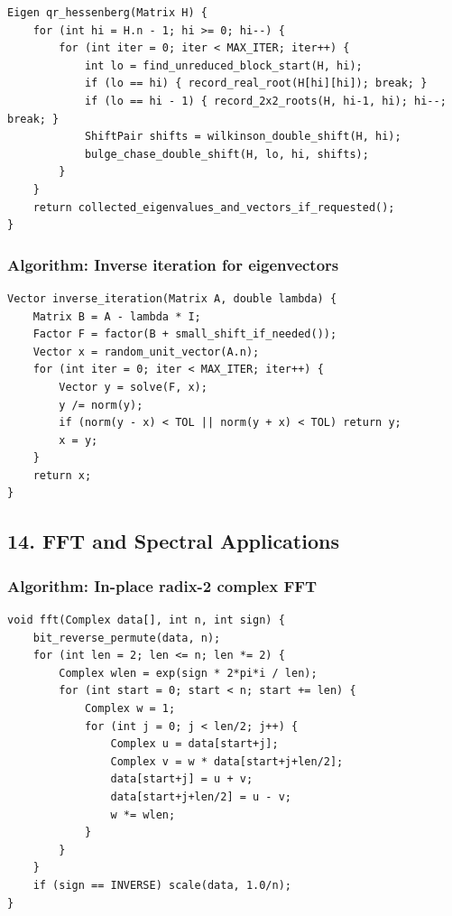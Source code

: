 \documentclass[11pt]{article}
\begin{document}
\begin{verbatim}
Eigen qr_hessenberg(Matrix H) {
    for (int hi = H.n - 1; hi >= 0; hi--) {
        for (int iter = 0; iter < MAX_ITER; iter++) {
            int lo = find_unreduced_block_start(H, hi);
            if (lo == hi) { record_real_root(H[hi][hi]); break; }
            if (lo == hi - 1) { record_2x2_roots(H, hi-1, hi); hi--; break; }
            ShiftPair shifts = wilkinson_double_shift(H, hi);
            bulge_chase_double_shift(H, lo, hi, shifts);
        }
    }
    return collected_eigenvalues_and_vectors_if_requested();
}
\end{verbatim}

\subsubsection{Algorithm: Inverse iteration for eigenvectors}\label{algorithm-inverse-iteration-for-eigenvectors}

\begin{verbatim}
Vector inverse_iteration(Matrix A, double lambda) {
    Matrix B = A - lambda * I;
    Factor F = factor(B + small_shift_if_needed());
    Vector x = random_unit_vector(A.n);
    for (int iter = 0; iter < MAX_ITER; iter++) {
        Vector y = solve(F, x);
        y /= norm(y);
        if (norm(y - x) < TOL || norm(y + x) < TOL) return y;
        x = y;
    }
    return x;
}
\end{verbatim}

\subsection{14. FFT and Spectral Applications}\label{fft-and-spectral-applications}

\subsubsection{Algorithm: In-place radix-2 complex FFT}\label{algorithm-in-place-radix-2-complex-fft}

\begin{verbatim}
void fft(Complex data[], int n, int sign) {
    bit_reverse_permute(data, n);
    for (int len = 2; len <= n; len *= 2) {
        Complex wlen = exp(sign * 2*pi*i / len);
        for (int start = 0; start < n; start += len) {
            Complex w = 1;
            for (int j = 0; j < len/2; j++) {
                Complex u = data[start+j];
                Complex v = w * data[start+j+len/2];
                data[start+j] = u + v;
                data[start+j+len/2] = u - v;
                w *= wlen;
            }
        }
    }
    if (sign == INVERSE) scale(data, 1.0/n);
}
\end{verbatim}
\end{document}
